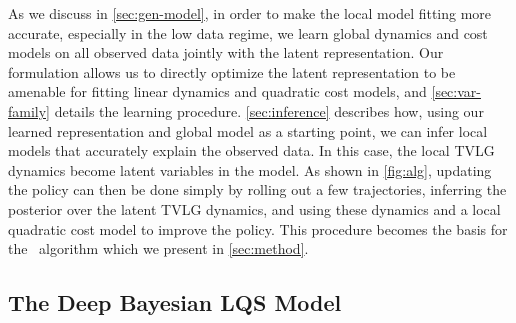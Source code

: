 As we discuss in \autoref{sec:gen-model}, in order to make the local model fitting more accurate, especially in the low data regime, we learn global dynamics and cost models on all observed data jointly with the latent representation. Our formulation allows us to directly optimize the latent representation to be amenable for fitting linear dynamics and quadratic cost models, and \autoref{sec:var-family} details the learning procedure. \autoref{sec:inference} describes how, using our learned representation and global model as a starting point, we can infer local models that accurately explain the observed data. In this case, the local TVLG dynamics become latent variables in the model. As shown in \autoref{fig:alg}, updating the policy can then be done simply by rolling out a few trajectories, inferring the posterior over the latent TVLG dynamics, and using these dynamics and a local quadratic cost model to improve the policy. This procedure becomes the basis for the \metabbr\ algorithm which we present in \autoref{sec:method}.

\subsection{The Deep Bayesian LQS Model}
\label{sec:gen-model}

